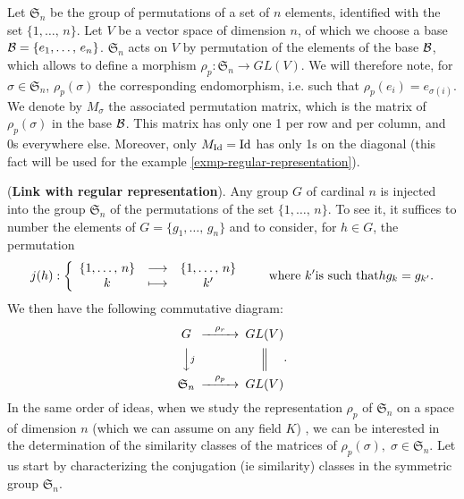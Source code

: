  
 
 
\begin{defn}
  Let $ \mathfrak{S}_n $ be the group of permutations of a set of $ n $ elements, identified with the set $ \{1, \ldots, \, n\} $. Let $V$ be a vector space of dimension $ n $, of which we choose a base $ \mathcal{B} = \{e_1, \ldots, \, e_n\} $. $ \mathfrak{S}_n $ acts on $V$ by permutation of the elements of the base $ \mathcal{B} $, which allows to define a morphism $ \rho_p : \mathfrak{S}_n \rightarrow GL (V) $. We will therefore note, for $ \sigma \in \mathfrak{S}_n $, $ \rho_p (\sigma) $ the corresponding endomorphism, i.e. such that $ \rho_p (e_i) = e_{\sigma (i)} $. We denote by $ M_{\sigma} $ the associated permutation matrix, which is the matrix of $ \rho_p (\sigma) $ in the base $ \mathcal{B} $. This matrix has only one 1 per row and per column, and 0s everywhere else. Moreover, only $ M_{\operatorname{Id}} = \operatorname{Id} $ has only 1s on the diagonal (this fact will be used for the example \ref{exmp-regular-representation}).
\end{defn}
 
 
\begin{rem}{(\upshape \textbf{Link with regular representation}).}
Any group $G$ of cardinal $ n $ is injected into the group $ \mathfrak{S}_n $ of the permutations of the set $ \{1, \ldots, \, n\} $. To see it, it suffices to number the elements of $ G = \{g_1, \ldots, \, g_n\} $ and to consider, for $ h \in G $, the permutation
\begin{equation*}
j (h): {\left\{ \begin{array}{ccc} \{1, \ldots, \, n\} & \longrightarrow & \{1, \ldots, \, n\} \\ k & \longmapsto & k' \end{array} \right.} \quad \quad \text{where } k'\text{is such that} h g_k = g_{k'}.
\end{equation*}
We then have the following commutative diagram:
\begin{equation*}
\begin{CD} G @>{\rho_r} >> GL (V) \\@VV{j} V@| \\\mathfrak{S}_n @>{\rho_p} >> GL (V) \end{CD}.
\end{equation*}
In the same order of ideas, when we study the representation $ \rho_p $ of $ \mathfrak{S}_n $ on a space of dimension $ n $ (which we can assume on any field $K$) , we can be interested in the determination of the similarity classes of the matrices of $ \rho_p (\sigma), \; \sigma \in \mathfrak{S}_n $. Let us start by characterizing the conjugation (ie similarity) classes in the symmetric group $ \mathfrak{S}_n $.
\end{rem}
 
